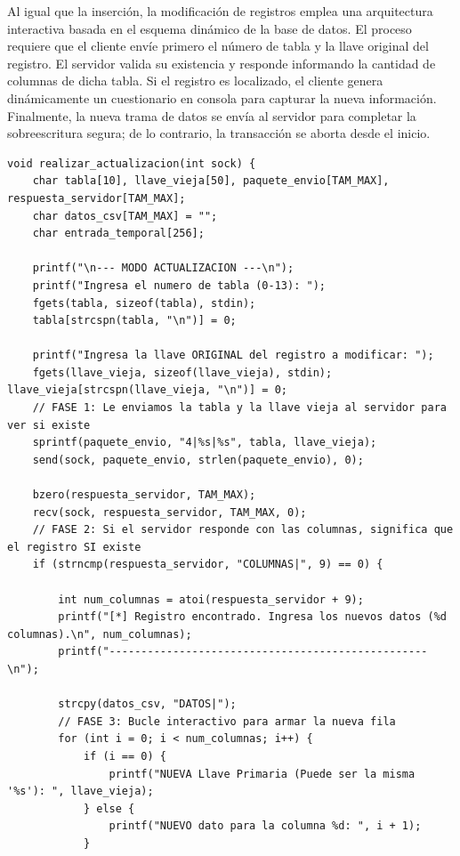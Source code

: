 \documentclass[12pt]{article}
\begin{document}
Al igual que la inserción, la modificación de registros emplea una arquitectura interactiva basada en el esquema dinámico de la base de datos. El proceso requiere que el cliente envíe primero el número de tabla y la llave original del registro. El servidor valida su existencia y responde informando la cantidad de columnas de dicha tabla. Si el registro es localizado, el cliente genera dinámicamente un cuestionario en consola para capturar la nueva información. Finalmente, la nueva trama de datos se envía al servidor para completar la sobreescritura segura; de lo contrario, la transacción se aborta desde el inicio.

\begin{lstlisting}[style=estiloC ,title={Código 5. Cliente TCP (ACTUALIZACION)}]
void realizar_actualizacion(int sock) {
    char tabla[10], llave_vieja[50], paquete_envio[TAM_MAX], respuesta_servidor[TAM_MAX];
    char datos_csv[TAM_MAX] = "";
    char entrada_temporal[256];

    printf("\n--- MODO ACTUALIZACION ---\n");
    printf("Ingresa el numero de tabla (0-13): ");
    fgets(tabla, sizeof(tabla), stdin);
    tabla[strcspn(tabla, "\n")] = 0;
    
    printf("Ingresa la llave ORIGINAL del registro a modificar: ");
    fgets(llave_vieja, sizeof(llave_vieja), stdin); llave_vieja[strcspn(llave_vieja, "\n")] = 0;
    // FASE 1: Le enviamos la tabla y la llave vieja al servidor para ver si existe
    sprintf(paquete_envio, "4|%s|%s", tabla, llave_vieja);
    send(sock, paquete_envio, strlen(paquete_envio), 0);

    bzero(respuesta_servidor, TAM_MAX);
    recv(sock, respuesta_servidor, TAM_MAX, 0);
    // FASE 2: Si el servidor responde con las columnas, significa que el registro SI existe
    if (strncmp(respuesta_servidor, "COLUMNAS|", 9) == 0) {
        
        int num_columnas = atoi(respuesta_servidor + 9);
        printf("[*] Registro encontrado. Ingresa los nuevos datos (%d columnas).\n", num_columnas);
        printf("--------------------------------------------------\n");

        strcpy(datos_csv, "DATOS|");
        // FASE 3: Bucle interactivo para armar la nueva fila
        for (int i = 0; i < num_columnas; i++) {
            if (i == 0) {
                printf("NUEVA Llave Primaria (Puede ser la misma '%s'): ", llave_vieja);
            } else {
                printf("NUEVO dato para la columna %d: ", i + 1);
            }
            

\end{lstlisting}
\end{document}
